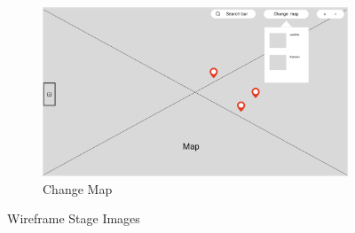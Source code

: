 \begin{figure}[H]
  \vspace{0.5cm}

  \begin{subfigure}[b]{0.3\textwidth}
    \includegraphics[width=\textwidth]{screenshot/wireframe_changemap.png}
    \caption{Change Map}
  \end{subfigure}

  \caption{Wireframe Stage Images}
  \label{fig:wireframe}
\end{figure}

